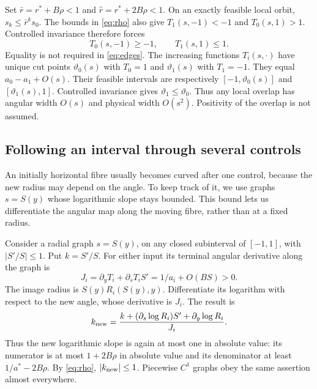 \documentclass[11pt]{amsart}
\theoremstyle{definition}
\theoremstyle{remark}
\numberwithin{equation}{section}
\begin{document}
Set \(\bar r=r^*+B\rho<1\) and
\(\widehat r=r^*+2B\rho<1\). On an exactly feasible local orbit,
\(s_k\le\bar r^ks_0\). The bounds in \eqref{eq:rho} also give
\(T_1(s,-1)<-1\) and \(T_0(s,1)>1\). Controlled invariance therefore
forces
\begin{equation}
T_0(s,-1)\ge-1,\qquad T_1(s,1)\le1.       \label{eq:edges}
\end{equation}
Equality is not required in \eqref{eq:edges}.
The increasing functions \(T_i(s,\cdot)\) have unique cut points
\(\vartheta_0(s)\) with \(T_0=1\) and \(\vartheta_1(s)\) with
\(T_1=-1\). They equal \(a_0-a_1+O(s)\).
Their feasible intervals are respectively
\([-1,\vartheta_0(s)]\) and \([\vartheta_1(s),1]\).
Controlled invariance gives \(\vartheta_1\le\vartheta_0\).
Thus any local overlap has angular width \(O(s)\) and physical
width \(O(s^2)\). Positivity of the overlap is not assumed.

\subsection{Following an interval through several controls}
An initially horizontal fibre usually becomes curved after one
control, because the new radius may depend on the angle. To keep
track of it, we use graphs $s=S(y)$ whose logarithmic slope stays
bounded. This bound lets us differentiate the angular map along
the moving fibre, rather than at a fixed radius.

Consider a radial graph \(s=S(y)\), on any closed subinterval of
\([-1,1]\), with \(|S'/S|\le1\). Put \(k=S'/S\).
For either input its terminal angular derivative along the graph is
\[
 J_i=\partial_yT_i+\partial_sT_i S'
           =1/a_i+O(BS)>0.
\]
The image radius is $S(y)R_i(S(y),y)$. Differentiate its logarithm
with respect to the new angle, whose derivative is $J_i$. The
result is
\begin{equation}
k_{\rm new}
 =\frac{k+(\partial_s\log R_i)S'+\partial_y\log R_i}{J_i}.
                                                                  \label{eq:coneupdate}
\end{equation}
Thus the new logarithmic slope is again at most one in absolute
value: its numerator is at most \(1+2B\rho\) in absolute value and its
denominator at least \(1/a^*-2B\rho\). By \eqref{eq:rho}, \(|k_{\rm new}|\le1\).
Piecewise \(C^1\) graphs obey the same assertion almost everywhere.
\end{document}
